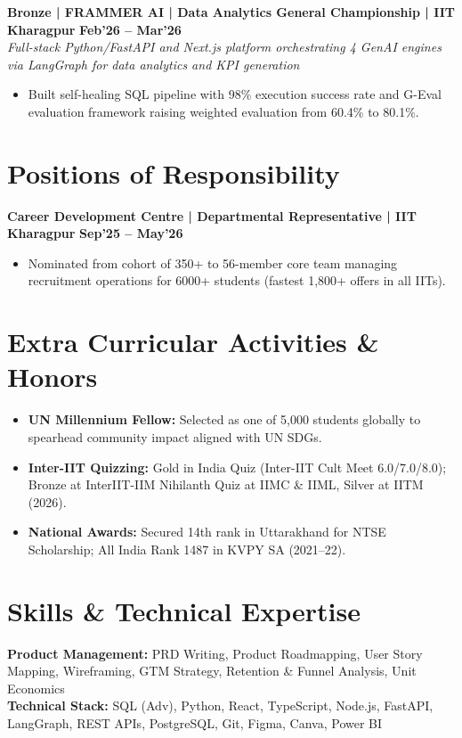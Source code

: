 \documentclass[10pt, a4paper]{article}
\newenvironment{achievelist}{
  \begin{itemize}[leftmargin=1.2em, itemsep=0.5pt, parsep=0pt, topsep=1pt]
    \small
}{
  \end{itemize}
  \vspace{-2pt}
}
\newcommand{\achieve}[1]{\item #1}
\begin{document}
\textbf{Bronze | FRAMMER AI | Data Analytics General Championship | IIT Kharagpur} \hfill \textbf{\small Feb'26 -- Mar'26} \\
\textit{\small Full-stack Python/FastAPI and Next.js platform orchestrating 4 GenAI engines via LangGraph for data analytics and KPI generation}
\begin{achievelist}
  \achieve{Built self-healing SQL pipeline with 98\% execution success rate and G-Eval evaluation framework raising weighted evaluation from 60.4\% to 80.1\%.}
\end{achievelist}

\vspace{-2pt}

\section{Positions of Responsibility}

\textbf{Career Development Centre | Departmental Representative | IIT Kharagpur} \hfill \textbf{\small Sep'25 -- May'26}
\begin{achievelist}
  \achieve{Nominated from cohort of 350+ to 56-member core team managing recruitment operations for 6000+ students (fastest 1,800+ offers in all IITs).}
\end{achievelist}

\vspace{-2pt}

\section{Extra Curricular Activities \& Honors}

\begin{itemize}[leftmargin=1.2em, itemsep=0.5pt, parsep=0pt, topsep=1pt]
  \small
  \item \textbf{UN Millennium Fellow:} Selected as one of 5,000 students globally to spearhead community impact aligned with UN SDGs.
  \item \textbf{Inter-IIT Quizzing:} Gold in India Quiz (Inter-IIT Cult Meet 6.0/7.0/8.0); Bronze at InterIIT-IIM Nihilanth Quiz at IIMC \& IIML, Silver at IITM (2026).
  \item \textbf{National Awards:} Secured 14th rank in Uttarakhand for NTSE Scholarship; All India Rank 1487 in KVPY SA (2021--22).
\end{itemize}

\vspace{-2pt}

\section{Skills \& Technical Expertise}

\noindent
\textbf{Product Management:} PRD Writing, Product Roadmapping, User Story Mapping, Wireframing, GTM Strategy, Retention \& Funnel Analysis, Unit Economics \\[2pt]
\textbf{Technical Stack:} SQL (Adv), Python, React, TypeScript, Node.js, FastAPI, LangGraph, REST APIs, PostgreSQL, Git, Figma, Canva, Power BI
\end{document}

